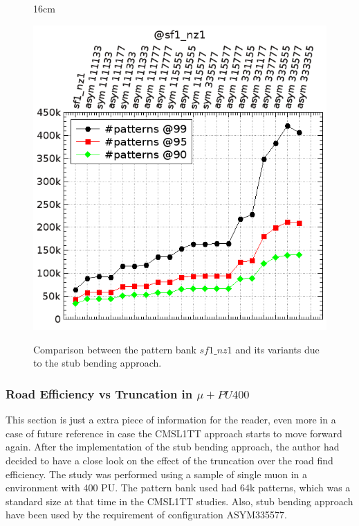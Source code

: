 \begin{figure}[htbp]{16cm}
	\caption{Comparison between the pattern bank $sf1\_nz1$ and its variants due to the stub bending approach.}
	\includegraphics[scale=0.5]{AppendixCMSL1TT/figs/sf1_nz1_pattern_banks}
	\label{fig:pattern_banks_comparison}	
\end{figure}
	
\subsubsection{Road Efficiency vs Truncation in $\mu+PU400$}
This section is just a extra piece of information for the reader, even more in a case of future reference in case the CMSL1TT approach starts to move forward again. After the implementation of the stub bending approach, the author had decided to have a close look on the effect of the truncation over the road find efficiency. The study was performed using a sample of single muon in a environment with 400 PU. The pattern bank used had 64k patterns, which was a standard size at that time in the CMSL1TT studies. Also, stub bending approach have been used by the requirement of configuration ASYM335577.

